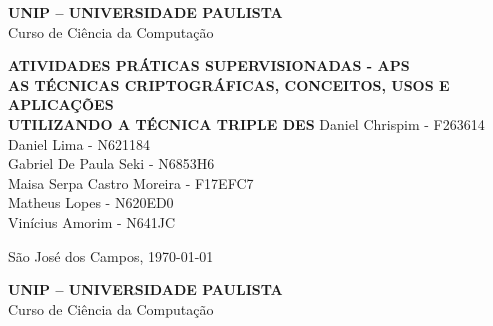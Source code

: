 \begin{titlepage} 
    \begin{center}
        \begin{minipage}{1\textwidth} 
            \large\centering{}
            {\LARGE\bfseries UNIP – UNIVERSIDADE PAULISTA\\}
            {\LARGE Curso de Ciência da Computação}
        \end{minipage}
    \end{center}
    
    \vfill\vfill
    
    \begin{center}
        {\large\bfseries ATIVIDADES PRÁTICAS SUPERVISIONADAS - APS }\\
        {\bfseries AS TÉCNICAS CRIPTOGRÁFICAS, CONCEITOS, USOS E APLICAÇÕES\\UTILIZANDO A TÉCNICA TRIPLE DES}
        \vfill
        Daniel Chrispim - F263614\\
        Daniel Lima - N621184\\
        Gabriel De Paula Seki - N6853H6\\
        Maisa Serpa Castro Moreira - F17EFC7\\
        Matheus Lopes - N620ED0\\
        Vinícius Amorim - N641JC
        
        \vfill
        
        {São José dos Campos, \today}\\[0.4cm]
    \end{center}
    
    \newpage
        
    \begin{center}
        \begin{minipage}{1\textwidth}
            \large\centering{}
            {\LARGE\bfseries UNIP – UNIVERSIDADE PAULISTA\\}
            {\LARGE Curso de Ciência da Computação}
        \end{minipage}
    \end{center}
    
    \vfill\vfill
    	

\end{titlepage}
